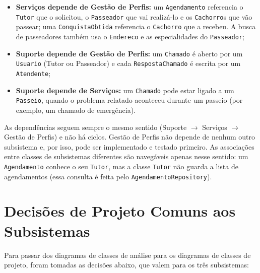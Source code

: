 \begin{itemize}
	\item \textbf{Serviços depende de Gestão de Perfis:} um \texttt{Agendamento} referencia o \texttt{Tutor} que o solicitou, o \texttt{Passeador} que vai realizá-lo e os \texttt{Cachorro}s que vão passear; uma \texttt{ConquistaObtida} referencia o \texttt{Cachorro} que a recebeu. A busca de passeadores também usa o \texttt{Endereco} e as especialidades do \texttt{Passeador};
	\item \textbf{Suporte depende de Gestão de Perfis:} um \texttt{Chamado} é aberto por um \texttt{Usuario} (Tutor ou Passeador) e cada \texttt{RespostaChamado} é escrita por um \texttt{Atendente};
	\item \textbf{Suporte depende de Serviços:} um \texttt{Chamado} pode estar ligado a um \texttt{Passeio}, quando o problema relatado aconteceu durante um passeio (por exemplo, um chamado de emergência).
\end{itemize}

As dependências seguem sempre o mesmo sentido (Suporte $\rightarrow$ Serviços $\rightarrow$ Gestão de Perfis) e não há ciclos. Gestão de Perfis não depende de nenhum outro subsistema e, por isso, pode ser implementado e testado primeiro. As associações entre classes de subsistemas diferentes são navegáveis apenas nesse sentido: um \texttt{Agendamento} conhece o seu \texttt{Tutor}, mas a classe \texttt{Tutor} não guarda a lista de agendamentos (essa consulta é feita pelo \texttt{AgendamentoRepository}).



\section{Decisões de Projeto Comuns aos Subsistemas}
\label{sec-logica-decisoes}

Para passar dos diagramas de classes de análise para os diagramas de classes de projeto, foram tomadas as decisões abaixo, que valem para os três subsistemas:

